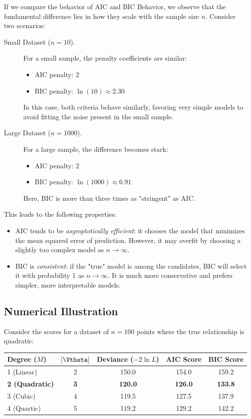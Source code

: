 \begin{myexample}
If we compare the behavior of AIC and BIC Behavior, we observe
that the fundamental difference lies in how they scale with the sample size $n$. Consider two scenarios:

\begin{description}
\item[Small Dataset ($n=10$).]
For a small sample, the penalty coefficients are similar:
\begin{itemize}
    \item AIC penalty: $2$
    \item BIC penalty: $\ln(10) \approx 2.30$
\end{itemize}
In this case, both criteria behave similarly, favoring very simple models to avoid fitting the noise present in the small sample.

\item[Large Dataset ($n=1000$).]
For a large sample, the difference becomes stark:
\begin{itemize}
    \item AIC penalty: $2$
    \item BIC penalty: $\ln(1000) \approx 6.91$
\end{itemize}
Here, BIC is more than three times as "stringent" as AIC. 
\end{description}
This leads to the following properties:
\begin{itemize}
    \item AIC tends to be \textit{asymptotically efficient}: it chooses the model that minimizes the mean squared error of prediction. However, it may overfit by choosing a slightly too complex model as $n \to \infty$.
    \item BIC is \textit{consistent}: if the "true" model is among the candidates, BIC will select it with probability 1 as $n \to \infty$. It is much more conservative and prefers simpler, more interpretable models.
\end{itemize}

\subsection*{Numerical Illustration}

Consider the scores for a dataset of $n=100$ points where the true relationship is quadratic:

\begin{center}
\begin{tabular}{|l|c|c|c|c|}
\hline
\textbf{Degree ($M$)} & \textbf{$|\Vtheta|$} & \textbf{Deviance ($-2\ln L$)} & \textbf{AIC Score} & \textbf{BIC Score} \\
\hline
1 (Linear) & 2 & 150.0 & 154.0 & 159.2 \\
\textbf{2 (Quadratic)} & \textbf{3} & \textbf{120.0} & \textbf{126.0} & \textbf{133.8} \\
3 (Cubic) & 4 & 119.5 & 127.5 & 137.9 \\
4 (Quartic) & 5 & 119.2 & 129.2 & 142.2 \\
\hline
\end{tabular}
\end{center}


\end{myexample}

